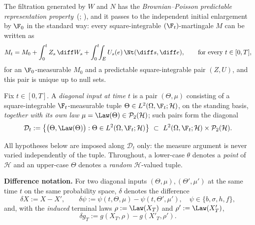 The filtration generated by $W$ and $N$ has the \emph{Brownian--Poisson predictable
representation property}~(\cite[\S5.3]{Applebaum}; \cite[Theorem~13.49]{HeWangYan}), and it
passes to the independent initial enlargement by $\F_0$ in the standard way:
every square-integrable $(\F_t)$-martingale $M$ can be written as
\[
M_t=M_0+\int_0^t Z_s\,\diff W_s+\int_0^t\!\!\int_E U_s(e)\,\Nt(\diff s,\diff e),
\qquad\text{for every }t\in[0,T],
\]
for an $\F_0$-measurable $M_0$ and a predictable square-integrable pair $(Z,U)$, and this
pair is unique up to null sets.

\begin{definition}\label{def:diag}
Fix $t\in[0,T]$. A \emph{diagonal input at time $t$} is a pair $(\Theta,\mu)$ consisting of a
square-integrable $\F_t$-measurable tuple $\Theta\in L^2(\Omega,\F_t;\mathcal H)$, on the
standing basis, \emph{together with its own law} $\mu=\Law(\Theta)\in\mathcal P_2(\mathcal H)$;
such pairs form the diagonal
\[
\mathcal D_t:=\bigl\{\bigl(\Theta,\Law(\Theta)\bigr):\Theta\in L^2(\Omega,\F_t;\mathcal H)\bigr\}
\ \subset\ L^2(\Omega,\F_t;\mathcal H)\times\mathcal P_2(\mathcal H).
\]
\end{definition}

\noindent All hypotheses below are imposed along $\mathcal D_t$ only: the measure argument is
never varied independently of the tuple. Throughout, a lower-case $\theta$ denotes a \emph{point} of
$\mathcal H$ and an upper-case $\Theta$ denotes a \emph{random} $\mathcal H$-valued tuple.

\smallskip\noindent\textbf{Difference notation.}
For two diagonal inputs $(\Theta,\mu),(\Theta',\mu')$ at the same time $t$ on the same
probability space, $\delta$ denotes the difference
\[
\delta X:=X-X',\qquad
\delta\psi:=\psi(t,\Theta,\mu)-\psi(t,\Theta',\mu'),\quad\psi\in\{b,\sigma,h,f\},
\]
and, with the \emph{induced} terminal laws $\rho:=\Law(X_T)$ and
$\rho':=\Law(X'_T)$,
\[
\delta g_T:=g(X_T,\rho)-g(X'_T,\rho') .
\]

